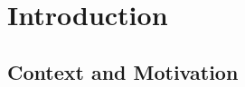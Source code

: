 
\chapter{Introduction}
\label{ch:introduction}


\section{Context and Motivation}
\label{sec:intro_context}

